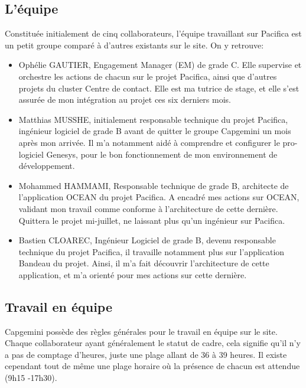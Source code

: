 \documentclass{rapport}
\begin{document}
\subsection{L'équipe}

Constituée initialement de cinq collaborateurs, l'équipe travaillant sur Pacifica est un petit groupe comparé à d'autres existants sur le site.
On y retrouve:\\

\begin{itemize}
  \item Ophélie GAUTIER, Engagement Manager (EM) de grade C. Elle supervise et orchestre les actions de chacun sur le projet Pacifica, ainsi que d'autres projets du cluster Centre de contact. Elle est ma tutrice de stage, et elle s'est assurée de mon intégration au projet ces six derniers mois.\\
  
  \item Matthias MUSSHE, initialement responsable technique du projet Pacifica, ingénieur logiciel de grade B avant de quitter le groupe Capgemini un mois après mon arrivée. Il m'a notamment aidé à comprendre et configurer le pro-logiciel Genesys, pour le bon fonctionnement de mon environnement de développement.\\
  
  \item Mohammed HAMMAMI, Responsable technique de grade B, architecte de l'application OCEAN du projet Pacifica. A encadré mes actions sur OCEAN, validant mon travail comme conforme à l'architecture de cette dernière. Quittera le projet mi-juillet, ne laissant plus qu'un ingénieur sur Pacifica.\\
  
  \item Bastien CLOAREC, Ingénieur Logiciel de grade B, devenu responsable technique du projet Pacifica, il travaille notamment plus sur l'application Bandeau du projet. Ainsi, il m'a fait découvrir l'architecture de cette application, et m'a orienté pour mes actions sur cette dernière.\\
  
\end{itemize}

\subsection{Travail en équipe}
Capgemini possède des règles générales pour le travail en équipe sur le site. Chaque collaborateur ayant généralement le statut de cadre, cela signifie qu'il n'y a pas de comptage d'heures, juste une plage allant de 36 à 39 heures. Il existe cependant tout de même une plage horaire où la présence de chacun est attendue (9h15 -17h30).\\
\end{document}
